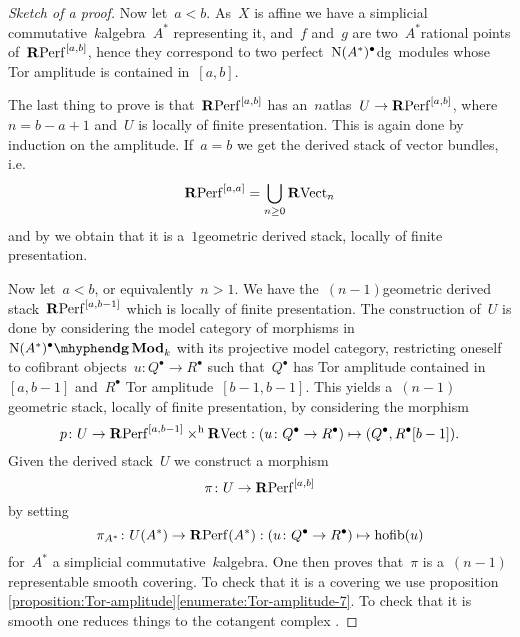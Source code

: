 \begin{refsection}
\begin{theorem}
\begin{proof}[Sketch of a proof]
    Now let~$a<b$. As~$X$ is affine we have a simplicial commutative~$k$\dash algebra~$A^*$ representing it, and~$f$ and~$g$ are two~$A^*$\dash rational points of~$\mathbf{R}\mathrm{Perf}^{[a,b]}$, hence they correspond to two perfect~$\operatorname{N}(A^*)^\bullet$\dash dg~modules whose Tor amplitude is contained in~$[a,b]$.


    The last thing to prove is that~$\mathbf{R}\mathrm{Perf}^{[a,b]}$ has an~$n$\dash atlas~$U\to\mathbf{R}\mathrm{Perf}^{[a,b]}$, where~$n=b-a+1$ and~$U$ is locally of finite presentation\addreference. This is again done by induction on the amplitude. If~$a=b$ we get the derived stack of vector bundles, i.e.\
    \begin{equation}
      \mathbf{R}\mathrm{Perf}^{[a,a]}=\bigcup_{n\geq 0}\mathbf{R}\mathrm{Vect}_n
    \end{equation}
    and by \cite[corollary 1.3.7.4]{hagII} we obtain that it is a~$1$\dash geometric derived stack, locally of finite presentation.

    Now let~$a<b$, or equivalently~$n>1$. We have the~$(n-1)$\dash geometric derived stack~$\mathbf{R}\mathrm{Perf}^{[a,b-1]}$ which is locally of finite presentation. The construction of~$U$ is done by considering the model category of morphisms in~$\dgMod{\nerve(A^*)^\bullet}_k$ with its projective model category, restricting oneself to cofibrant objects~$u\colon Q^\bullet\to R^\bullet$ such that~$Q^\bullet$ has Tor amplitude contained in~$[a,b-1]$ and~$R^\bullet$ Tor amplitude~$[b-1,b-1]$\checkthis. This yields a~$(n-1)$\dash geometric stack, locally of finite presentation, by considering the morphism
    \begin{equation}
      p\colon U\to\mathbf{R}\mathrm{Perf}^{[a,b-1]}\times^{\mathrm{h}}\mathbf{R}\mathrm{Vect}:(u\colon Q^\bullet\to R^\bullet)\mapsto(Q^\bullet,R^\bullet[b-1]).
    \end{equation}
    Given the derived stack~$U$ we construct a morphism
    \begin{equation}
      \pi\colon U\to\mathbf{R}\mathrm{Perf}^{[a,b]}
    \end{equation}
    by setting
    \begin{equation}
      \pi_{A^*}\colon U(A^*)\to\mathbf{R}\mathrm{Perf}(A^*):(u\colon Q^\bullet\to R^\bullet)\mapsto\operatorname{hofib}(u)
    \end{equation}
    for~$A^*$ a simplicial commutative~$k$\dash algebra. One then proves that~$\pi$ is a~$(n-1)$\dash representable smooth covering. To check that it is a covering we use proposition \ref{proposition:Tor-amplitude}\ref{enumerate:Tor-amplitude-7}. To check that it is smooth one reduces things to the cotangent complex \cite[corollary 2.2.5.3]{hagII}.
  \end{proof}
\end{theorem}


\end{refsection}
